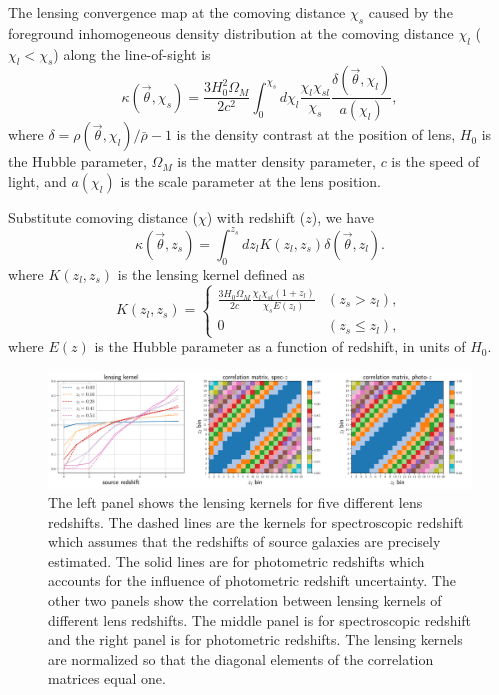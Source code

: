 \documentclass[twocolumn]{aastex62}
\begin{document}
The lensing convergence map at the comoving distance $\chi_s$ caused by the foreground inhomogeneous
density distribution at the comoving distance $\chi_l$ ($\chi_l< \chi_s$) along the line-of-sight is
\begin{equation}
\kappa(\vec{\theta},\chi_s)=\frac{3H_0^2\Omega_M}{2 c^2} \int_0^{\chi_s} d\chi_l \frac{\chi_l \chi_{sl}}{\chi_s}
\frac{\delta(\vec{\theta},\chi_l)}{a(\chi_l)},
\end{equation}
where $\delta=\rho(\vec{\theta},\chi_l)/\bar{\rho}-1$ is the density contrast
at the position of lens, $H_0$ is the Hubble parameter, $\Omega_M$ is the matter density parameter, $c$ is the speed
of light, and $a(\chi_l)$ is the scale parameter at the lens position.

Substitute comoving distance ($\chi$) with redshift ($z$), we have
\begin{equation}\label{eq-delta2kappa}
\kappa(\vec{\theta},z_s)=\int_0^{z_s} dz_l K(z_l,z_s)\delta(\vec{\theta},z_l).
\end{equation}
where $K(z_l,z_s)$ is the lensing kernel defined as
\begin{equation}
K(z_l,z_s) =
\begin{cases}
\frac{3H_0\Omega_M}{2 c} \frac{\chi_l \chi_{sl} (1+z_l)}{\chi_{s} E\left(z_l\right)} & (z_s>z_l),\\
0&(z_s \leq z_l),
\end{cases}
\end{equation}
where $E(z)$ is the Hubble parameter as a function of redshift, in units of $H_0$.

\begin{figure}[!t]
 \centering
 \includegraphics[width=1.\textwidth]{lensing_kernel.pdf}
 \caption{The left panel shows the lensing kernels for five different lens redshifts. The dashed lines are the 
        kernels for spectroscopic redshift which assumes that the redshifts of source galaxies are precisely 
        estimated. The solid lines are for photometric redshifts which accounts for the influence of photometric 
        redshift uncertainty. The other two panels show the correlation between lensing kernels of different 
        lens redshifts. The middle panel is for spectroscopic redshift and the right panel is for photometric 
        redshifts. The lensing kernels are normalized so that the diagonal elements of the correlation matrices
        equal one.}\label{fig-corlensKer}
\end{figure}
\end{document}
